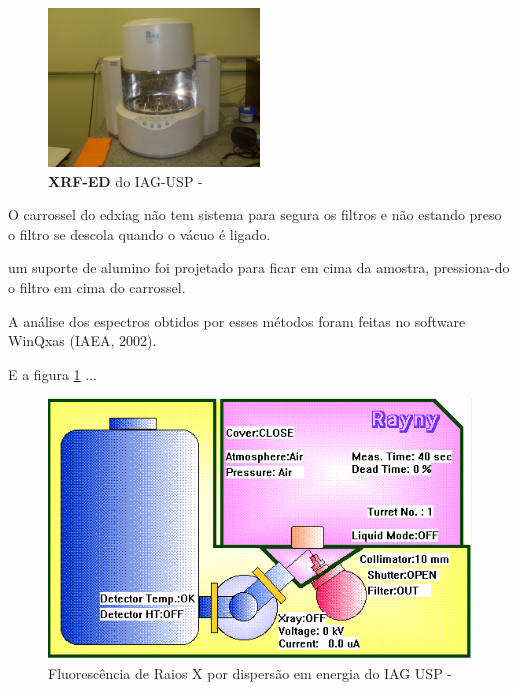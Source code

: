\begin{figure}[H]
\begin{center}
  \includegraphics[width=0.5\textwidth]{../inputs/images/xrf-ed-IAG-USP.jpg}
  \caption{\textbf{XRF-ED} do IAG-USP - \label{fig:xrfed_iag}}
\end{center}
\end{figure}

O carrossel do edxiag não tem sistema para segura os filtros e
não estando preso o filtro se descola quando o vácuo é ligado. 

um suporte de alumino foi projetado para ficar em cima da amostra, pressiona-do o filtro
em cima do carrossel.



A análise dos espectros obtidos por esses métodos foram feitas no software WinQxas (IAEA, 2002).


E a figura \ref{fig:xrfed_iag} ...

\begin{figure}[H]
\begin{center}
  \includegraphics[scale=0.4]{../inputs/images/edx_iag_monitor.png}
  \caption{Fluorescência de Raios X por dispersão em energia do IAG USP - \label{fig:xrfed_software}}
\end{center}
\end{figure}

